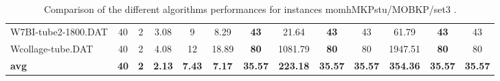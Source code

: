 \begin{table}[h]
{\begin{tabular}{lcccccccccccc}
W7BI-tube2-1800.DAT & 40 & 2 &  \textcolor{blue2}{3.08} & 9 & 8.29 &  \textbf{43} & 21.64 &  \textbf{43} & 43 & 61.79 &  \textbf{43} & 43 \\
Wcollage-tube.DAT & 40 & 2 &  \textcolor{blue2}{4.08} & 12 & 18.89 &  \textbf{80} & 1081.79 &  \textbf{80} & 80 & 1947.51 &  \textbf{80} & 80 \\
\cline{1-13} \textbf{avg} & \textbf{40} & \textbf{2} & \textbf{2.13} & \textbf{7.43} & \textbf{7.17} & \textbf{35.57} & \textbf{223.18} & \textbf{35.57} & \textbf{35.57} & \textbf{354.36} & \textbf{35.57} & \textbf{35.57} \\ \cline{1-13}
\bottomrule
\end{tabular}
}%
\caption{Comparison of the different algorithms performances for instances momhMKPstu/MOBKP/set3 .}
\label{tab:table_compare_momhMKPstu/MOBKP/set3 }
\end{table}
